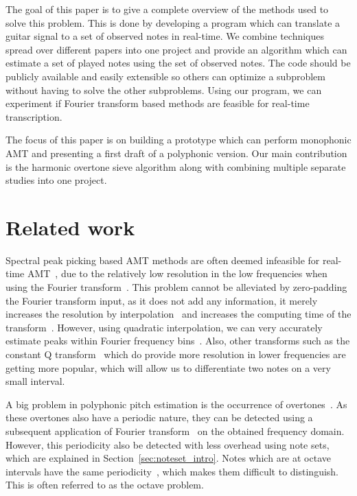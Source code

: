 \documentclass[10pt,twocolumn]{article}
\begin{document}
The goal of this paper is to give a complete overview of the methods used to solve this problem. This is done by developing a program which can translate a guitar signal to a set of observed notes in real-time. We combine techniques spread over different papers into one project and provide an algorithm which can estimate a set of played notes using the set of observed notes. The code should be publicly available and easily extensible so others can optimize a subproblem without having to solve the other subproblems. Using our program, we can experiment if Fourier transform based methods are feasible for real-time transcription.

The focus of this paper is on building a prototype which can perform monophonic AMT and presenting a first draft of a polyphonic version. Our main contribution is the harmonic overtone sieve algorithm along with combining multiple separate studies into one project.


\section{Related work}
Spectral peak picking based AMT methods are often deemed infeasible for real-time AMT~\cite{hater}, due to the relatively low resolution in the low frequencies when using the Fourier transform~\cite{theoretisch}. This problem cannot be alleviated by zero-padding the Fourier transform input, as it does not add any information, it merely increases the resolution by interpolation~\cite{infomax}\cite{infomax2} and increases the computing time of the transform~\cite{boek}. However, using quadratic interpolation, we can very accurately estimate peaks within Fourier frequency bins~\cite{interpol}. Also, other transforms such as the constant Q transform~\cite{cqt} which do provide more resolution in lower frequencies are getting more popular, which will allow us to differentiate two notes on a very small interval.

A big problem in polyphonic pitch estimation is the occurrence of overtones~\cite{oud}. As these overtones also have a periodic nature, they can be detected using a subsequent application of Fourier transform~\cite{double} on the obtained frequency domain. However, this periodicity also be detected with less overhead using note sets, which are explained in Section~\ref{sec:noteset_intro}. Notes which are at octave intervals have the same periodicity~\cite{octave}, which makes them difficult to distinguish. This is often referred to as the octave problem.
\end{document}
